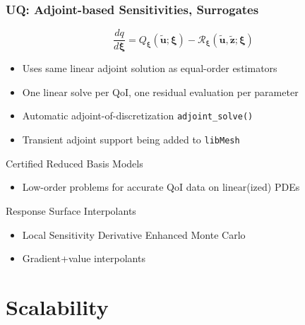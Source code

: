 \documentclass[mathserif]{beamer}
\newcommand{\bv}[1]{{\ensuremath{\boldsymbol{#1}}}}
\newcommand{\Res}{{\ensuremath{\mathcal R}}}
\newcommand{\primalsol}{{\ensuremath{\bv{\tilde{u}}}}}
\newcommand{\adjointsol}{{\ensuremath{\bv{\tilde{z}}}}}
\newcommand{\qoi}{{\ensuremath{q}}}
\newcommand{\Qoi}{{\ensuremath{Q}}}
\newcommand{\param}{{\ensuremath{\xi}}}
\newcommand{\params}{{\ensuremath{\bv{\param}}}}
\newcommand{\software}[1]{\texttt{#1}}
\newcommand{\libMesh}{\software{libMesh}}
\begin{document}
\begin{frame}
\frametitle{UQ: Adjoint-based Sensitivities, Surrogates}

\begin{equation*}
\frac{d \qoi}{d \params} = \Qoi_\params(\primalsol; \params) -
 \Res_\params(\primalsol, \adjointsol; \params)
\end{equation*}

\begin{itemize}
\item Uses same linear adjoint solution as equal-order estimators
\item One linear solve per QoI, one residual evaluation per parameter
\item Automatic adjoint-of-discretization {\texttt{adjoint\_solve()}}
\item Transient adjoint support being added to \libMesh
\end{itemize}

\begin{block}{Certified Reduced Basis Models}
\begin{itemize}
	\item Low-order problems for accurate QoI data on linear(ized) PDEs
\end{itemize}
\end{block}

\begin{block}{Response Surface Interpolants}
\begin{itemize}
	\item Local Sensitivity Derivative Enhanced Monte Carlo
	\item Gradient+value interpolants
\end{itemize}
\end{block}

\end{frame}



\section{Scalability}
\end{document}
